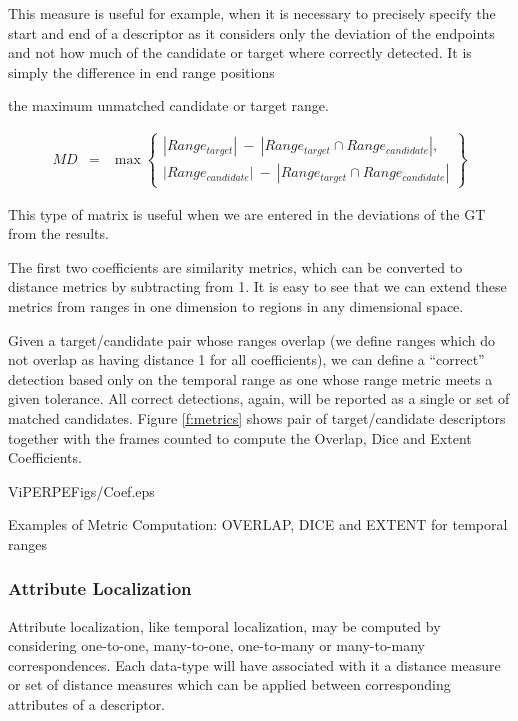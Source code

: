 \begin {description}
This measure is useful for example, when it is necessary to precisely
specify the start and end of a descriptor as it considers only the
deviation of the endpoints and not how much of the candidate or target
where correctly detected.  It is simply the difference in end range positions 

\item [MAX\_DEV -] the maximum unmatched candidate or target range.

\begin{eqnarray}
        MD  & = & \max \left\{ \begin{array}{c}
{|Range_{target}| ~-~ |Range_{target}\cap Range_{candidate}|},\\
{|Range_{candidate}| ~-~ |Range_{target}\cap Range_{candidate}|}
\end{array} \right\} 
\end{eqnarray}

This type of matrix is useful when we are entered in the deviations of
the GT from the results.

\end{description}

The first two coefficients are similarity metrics, which can be
converted to distance metrics by subtracting from 1.  It is easy to
see that we can extend these metrics from ranges in one dimension to
regions in any dimensional space.


Given a target/candidate pair whose ranges overlap (we define ranges
which do not overlap as having distance 1 for all coefficients), we
can define a ``correct'' detection based only on the temporal range as
one whose range metric meets a given tolerance.  All correct
detections, again, will be reported as a single or set of matched
candidates.  Figure \ref{f:metrics} shows  pair of target/candidate descriptors together with the frames counted to compute the Overlap, Dice and Extent Coefficients.


\begin{putfig}{ViPERPEFigs/Coef.eps}
\caption{Examples of Metric Computation: OVERLAP, DICE and EXTENT for temporal ranges}
\label{f:metrics}
\end{putfig}

\subsubsection{Attribute Localization}

Attribute localization, like temporal localization, may be computed by
considering one-to-one, many-to-one, one-to-many or many-to-many
correspondences.  Each data-type will have associated with it a
distance measure or set of distance measures which can be applied
between corresponding attributes of a descriptor.

